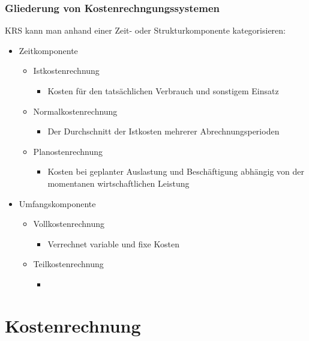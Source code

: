 \documentclass{article}
\begin{document}
	\subsubsection{Gliederung von Kostenrechngungssystemen}
	KRS kann man anhand einer Zeit- oder Strukturkomponente kategorisieren:
	\begin{itemize}
		\item{Zeitkomponente}
		\begin{itemize}
			\item{Istkostenrechnung}
			\begin{itemize}
				\item{Kosten für den tatsächlichen Verbrauch und sonstigem Einsatz}
			\end{itemize}
			\item{Normalkostenrechnung}
			\begin{itemize}
				\item{Der Durchschnitt der Istkosten mehrerer Abrechnungsperioden}
			\end{itemize}
			\item{Planostenrechnung}
			\begin{itemize}
				\item{Kosten bei geplanter Auslastung und Beschäftigung abhängig von der momentanen wirtschaftlichen Leistung}
			\end{itemize}
		\end{itemize}
		\item{Umfangskomponente}
		\begin{itemize}
			\item{Vollkostenrechnung}
			\begin{itemize}
				\item{Verrechnet variable und fixe Kosten}
			\end{itemize}
			\item{Teilkostenrechnung}
			\begin{itemize}
				\item{}
			\end{itemize}
		\end{itemize}
	\end{itemize}
		\section{Kostenrechnung}
\end{document}
